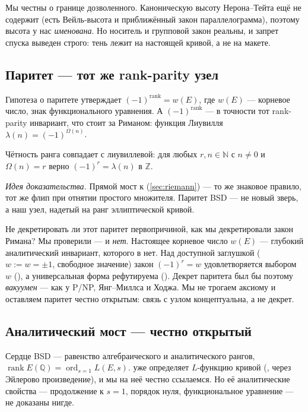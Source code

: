 Мы честны о границе дозволенного. Каноническую высоту Нерона–Тейта  ещё не содержит
(есть Вейль-высота и приближённый закон параллелограмма), поэтому высота у нас \emph{именована}. Но
носитель и групповой закон реальны, и запрет спуска выведен строго: тень лежит на настоящей кривой,
а не на макете.

\subsection{Паритет — тот же rank-parity узел}

Гипотеза о паритете утверждает $(-1)^{\operatorname{rank}}=w(E)$, где $w(E)$ — корневое число, знак
функционального уравнения. А $(-1)^{\operatorname{rank}}$ — в точности тот rank-parity инвариант,
что стоит за Риманом: функция Лиувилля $\lambda(n)=(-1)^{\Omega(n)}$.

\begin{theorem}\label{thm:bsd_parity_is_rankParity}
\green{} Чётность ранга совпадает с лиувиллевой: для любых $r,n\in\mathbb{N}$ с $n\neq 0$ и
$\Omega(n)=r$ верно $(-1)^r=\lambda(n)$ в $\mathbb{Z}$.
\end{theorem}

\emph{Идея доказательства.} Прямой мост к
 (\cref{sec:riemann}) — то же знаковое
правило, тот же флип при отнятии простого множителя. Паритет BSD — не новый зверь, а наш узел,
надетый на ранг эллиптической кривой.

Не декретировать ли этот паритет первопричиной, как мы декретировали закон Римана? Мы проверили — и
\emph{нет}. Настоящее корневое число $w(E)$ — глубокий аналитический инвариант, которого в
 нет. Над доступной заглушкой (\,$w:=w=\pm1$, свободное значение)
закон $(-1)^r=w$ удовлетворяется выбором $w$ (), а универсальная
форма рефутируема (). Декрет паритета был бы поэтому
\emph{вакуумен} — как у P/NP, Янг–Миллса и Ходжа. Мы не трогаем аксиому и оставляем паритет честно
открытым: связь с узлом концептуальна, а не декрет.

\subsection{Аналитический мост — честно открытый}

Сердце BSD — равенство алгебраического и аналитического рангов,
$\operatorname{rank}E(\mathbb{Q})=\operatorname{ord}_{s=1}L(E,s)$.  уже определяет
$L$-функцию кривой (, через Эйлерово произведение), и мы на неё честно
ссылаемся. Но её аналитические свойства — продолжение к $s=1$, порядок нуля, функциональное
уравнение — не доказаны нигде.

